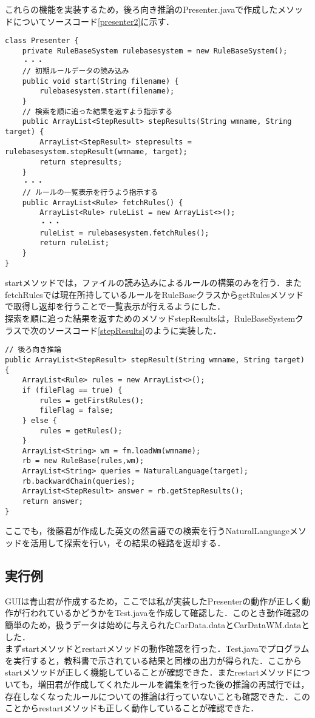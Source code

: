 \documentclass[12pt]{jarticle}
\begin{document}
これらの機能を実装するため，後ろ向き推論のPresenter.javaで作成したメソッドについてソースコード\ref{presenter2}に示す．
\begin{lstlisting}[caption=Presenter.java(略),label=presenter2]
class Presenter {
	private RuleBaseSystem rulebasesystem = new RuleBaseSystem();
	・・・
	// 初期ルールデータの読み込み
	public void start(String filename) {
		rulebasesystem.start(filename);
	}
	// 検索を順に追った結果を返すよう指示する
	public ArrayList<StepResult> stepResults(String wmname, String target) {
		ArrayList<StepResult> stepresults = rulebasesystem.stepResult(wmname, target);
		return stepresults;
	}
	・・・
	// ルールの一覧表示を行うよう指示する
	public ArrayList<Rule> fetchRules() {
		ArrayList<Rule> ruleList = new ArrayList<>();
		・・・
		ruleList = rulebasesystem.fetchRules();
		return ruleList;
	}
}
\end{lstlisting}
startメソッドでは，ファイルの読み込みによるルールの構築のみを行う．またfetchRulesでは現在所持しているルールをRuleBaseクラスからgetRulesメソッドで取得し返却を行うことで一覧表示が行えるようにした．\\

探索を順に追った結果を返すためのメソッドstepResultsは，RuleBaseSystemクラスで次のソースコード\ref{stepResults}のように実装した．
\begin{lstlisting}[caption=stepResultsメソッド,label=stepResults]
// 後ろ向き推論
public ArrayList<StepResult> stepResult(String wmname, String target) {
	ArrayList<Rule> rules = new ArrayList<>();
	if (fileFlag == true) {
		rules = getFirstRules();
		fileFlag = false;
	} else {
		rules = getRules();
	}
	ArrayList<String> wm = fm.loadWm(wmname);
	rb = new RuleBase(rules,wm);
	ArrayList<String> queries = NaturalLanguage(target);
	rb.backwardChain(queries);
	ArrayList<StepResult> answer = rb.getStepResults();
	return answer;
}
\end{lstlisting}
ここでも，後藤君が作成した英文の然言語での検索を行うNaturalLanguageメソッドを活用して探索を行い，その結果の経路を返却する．

\subsection{実行例}
GUIは青山君が作成するため，ここでは私が実装したPresenterの動作が正しく動作が行われているかどうかをTest.javaを作成して確認した．このとき動作確認の簡単のため，扱うデータは始めに与えられたCarData.dataとCarDataWM.dataとした．\\

まずstartメソッドとrestartメソッドの動作確認を行った．Test.javaでプログラムを実行すると，教科書で示されている結果と同様の出力が得られた．ここからstartメソッドが正しく機能していることが確認できた．またrestartメソッドについても，増田君が作成してくれたルールを編集を行った後の推論の再試行では，存在しなくなったルールについての推論は行っていないことも確認できた．このことからrestartメソッドも正しく動作していることが確認できた．\\
\end{document}
